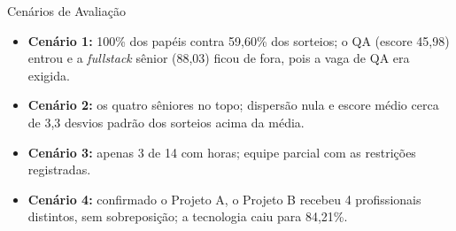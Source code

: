\documentclass{beamer}
\begin{document}
\begin{frame}[allowframebreaks]{Cenários de Avaliação}
    \begin{table}
        \caption{Resultados dos cenários de avaliação.}
    \end{table}

    \framebreak

    \begin{itemize}
        \item \textbf{Cenário 1:} 100\% dos papéis contra 59,60\% dos sorteios; o QA (escore 45,98) entrou e a \textit{fullstack} sênior (88,03) ficou de fora, pois a vaga de QA era exigida.
        \item \textbf{Cenário 2:} os quatro sêniores no topo; dispersão nula e escore médio cerca de 3,3 desvios padrão dos sorteios acima da média.
        \item \textbf{Cenário 3:} apenas 3 de 14 com horas; equipe parcial com as restrições registradas.
        \item \textbf{Cenário 4:} confirmado o Projeto A, o Projeto B recebeu 4 profissionais distintos, sem sobreposição; a tecnologia caiu para 84,21\%.
    \end{itemize}
\end{frame}
\end{document}
